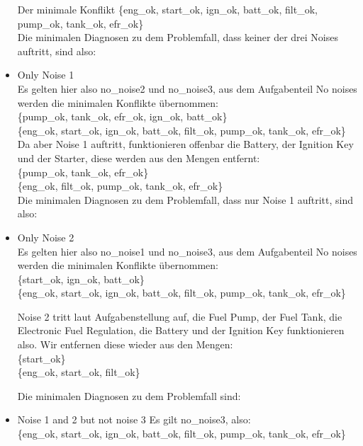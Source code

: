 \documentclass[ngerman]{fbi-aufgabenblatt}
\begin{document}
\begin{itemize}
Der minimale Konflikt \{eng\_ok, start\_ok, ign\_ok, batt\_ok, filt\_ok, pump\_ok, tank\_ok, efr\_ok\} \\

Die minimalen Diagnosen zu dem Problemfall, dass keiner der drei Noises auftritt, sind also: \\


\item Only Noise 1 \\
Es gelten hier also no\_noise2 und no\_noise3, aus dem Aufgabenteil \glqq No noises\grqq{} werden die minimalen Konflikte übernommen: \\
\{pump\_ok, tank\_ok, efr\_ok, ign\_ok, batt\_ok\} \\
\{eng\_ok, start\_ok, ign\_ok, batt\_ok, filt\_ok, pump\_ok, tank\_ok, efr\_ok\} \\

Da aber Noise 1 auftritt, funktionieren offenbar die Battery, der Ignition Key und der Starter, diese werden aus den Mengen entfernt: \\
\{pump\_ok, tank\_ok, efr\_ok\} \\
\{eng\_ok, filt\_ok, pump\_ok, tank\_ok, efr\_ok\} \\

Die minimalen Diagnosen zu dem Problemfall, dass nur Noise 1 auftritt, sind also: \\





\item Only Noise 2 \\
Es gelten hier also no\_noise1 und no\_noise3, aus dem Aufgabenteil \glqq No noises\grqq{} werden die minimalen Konflikte übernommen: \\
\{start\_ok, ign\_ok, batt\_ok\} \\
\{eng\_ok, start\_ok, ign\_ok, batt\_ok, filt\_ok, pump\_ok, tank\_ok, efr\_ok\}

Noise 2 tritt laut Aufgabenstellung auf, die Fuel Pump, der Fuel Tank, die Electronic Fuel Regulation, die Battery und der Ignition Key funktionieren also. Wir entfernen diese wieder aus den Mengen: \\
\{start\_ok\} \\
\{eng\_ok, start\_ok, filt\_ok\}

Die minimalen Diagnosen zu dem Problemfall sind: \\



\item Noise 1 and 2 but not noise 3
Es gilt no\_noise3, also: \\
\{eng\_ok, start\_ok, ign\_ok, batt\_ok, filt\_ok, pump\_ok, tank\_ok, efr\_ok\} \\


\end{itemize}
\end{document}
